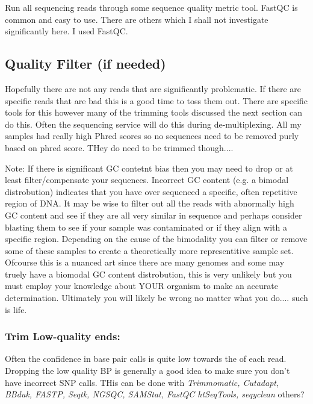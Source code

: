 \documentclass{article}
\begin{document}
    Run all sequencing reads through some sequence quality metric tool.   FastQC is common and easy to use.  There are others which I shall not investigate significantly here.   I used FastQC.

    \subsection{\textbf{Quality Filter (if needed)}}

    Hopefully there are not any reads that are significantly problematic.   If there are specific reads that are bad this is a good time to toss them out.   There are specific tools for this however many of the trimming tools discussed the next section can do this.   Often the sequencing service will do this during de-multiplexing.    All my samples had really high Phred scores so no sequences need to be removed purly based on phred score.   THey do need to be trimmed though....

    Note:  If there is significant GC contetnt bias then you may need to drop or at least filter/compensate your sequences.   Incorrect GC content (e.g. a bimodal distrobution) indicates that you have over sequenced a specific, often repetitive region of DNA.   It may be wise to filter out all the reads with abnormally high GC content and see if they are all very similar in sequence and perhaps consider blasting them to see if your sample was contaminated or if they align with a specific region.    Depending on the cause of the bimodality you can filter or remove some of these samples to create a theoretically more representitive sample set.   Ofcourse this is a nuanced art since there are many genomes and some may truely have a biomodal GC content distrobution, this is very unlikely but you must employ your knowledge about YOUR organism to make an accurate determination.  Ultimately you will likely be wrong no matter what you do.... such is life.
    
    \subsubsection{\textbf{Trim Low-quality ends:}}
    
    Often the confidence in base pair calls is quite low towards the of each read.  Dropping the low quality BP is generally a good idea to make sure you don't have incorrect SNP calls.   THis can be done with \textit{Trimmomatic, Cutadapt, BBduk, FASTP, Seqtk, NGSQC, SAMStat, FastQC htSeqTools, seqyclean} others?
\end{document}
